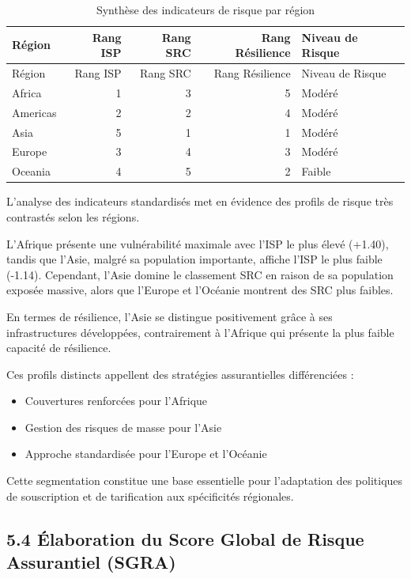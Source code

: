 \documentclass[
]{article}
\begin{document}
\begin{longtable}[]{@{}lrrrl@{}}
\caption{Synthèse des indicateurs de risque par région}\tabularnewline
\toprule\noalign{}
Région & Rang ISP & Rang SRC & Rang Résilience & Niveau de Risque \\
\midrule\noalign{}
\endfirsthead
\toprule\noalign{}
Région & Rang ISP & Rang SRC & Rang Résilience & Niveau de Risque \\
\midrule\noalign{}
\endhead
\bottomrule\noalign{}
\endlastfoot
Africa & 1 & 3 & 5 & Modéré \\
Americas & 2 & 2 & 4 & Modéré \\
Asia & 5 & 1 & 1 & Modéré \\
Europe & 3 & 4 & 3 & Modéré \\
Oceania & 4 & 5 & 2 & Faible \\
\end{longtable}

L'analyse des indicateurs standardisés met en évidence des profils de
risque très contrastés selon les régions.

L'Afrique présente une vulnérabilité maximale avec l'ISP le plus élevé
(+1.40), tandis que l'Asie, malgré sa population importante, affiche
l'ISP le plus faible (-1.14). Cependant, l'Asie domine le classement SRC
en raison de sa population exposée massive, alors que l'Europe et
l'Océanie montrent des SRC plus faibles.

En termes de résilience, l'Asie se distingue positivement grâce à ses
infrastructures développées, contrairement à l'Afrique qui présente la
plus faible capacité de résilience.

Ces profils distincts appellent des stratégies assurantielles
différenciées :

\begin{itemize}
\item
  Couvertures renforcées pour l'Afrique
\item
  Gestion des risques de masse pour l'Asie
\item
  Approche standardisée pour l'Europe et l'Océanie
\end{itemize}

Cette segmentation constitue une base essentielle pour l'adaptation des
politiques de souscription et de tarification aux spécificités
régionales.

\subsection{5.4 Élaboration du Score Global de Risque Assurantiel
(SGRA)}\label{uxe9laboration-du-score-global-de-risque-assurantiel-sgra}
\end{document}
